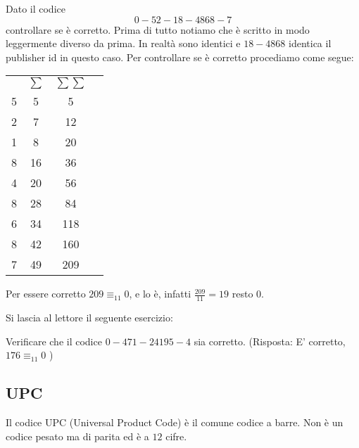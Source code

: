 \documentclass[12pt]{report}
\begin{document}
    \begin{es}
        Dato il codice $$0-52-18-4868-7$$
        controllare se è corretto. Prima di tutto notiamo che è scritto in modo leggermente diverso da prima. In realtà sono identici e $18-4868$ identica il publisher id in questo caso.
        Per controllare se è corretto procediamo come segue:

        \begin{center}
            \begin{tabular}{lccl}
                &$\sum$& $\sum \sum$ \\
                5 & 5 & 5 \\
                2 & 7 & 12 \\
                1 & 8 & 20 \\
                8 & 16 & 36 \\
                4 & 20 & 56 \\
                8 & 28 & 84 \\
                6 & 34 & 118 \\
                8 & 42 & 160 \\
                7 & 49 & 209
            \end{tabular}
        \end{center}

        \noindent
        Per essere corretto $209 \equiv_11 0$, e lo è, infatti $\frac{209}{11} = 19$ resto $0$.
    \end{es}

    \noindent
    Si lascia al lettore il seguente esercizio:

    \begin{es}
        Verificare che il codice $0-471-24195-4$ sia corretto.
        (Risposta: E' corretto, $176 \equiv_{11} 0$ )
    \end{es}

    \subsection{UPC}
    Il codice UPC (Universal Product Code) è il comune codice a barre. Non è un codice pesato ma di parita ed è a $12$ cifre.
\end{document}
